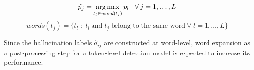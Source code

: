 $$
\Tilde{p_j} = \operatorname*{\arg\max}_{t_l \in word(t_j)} p_l\;\;\; \forall\; j = 1, \ldots, L
$$
$$
words(t_j) = \{t_l \;:\; t_l \;\text{and}\; t_j \;\text{belong to the same word}\; \forall\;l=1,\ldots,L\}
$$

Since the hallucination labels $\hat a_{ij}$ are constructed at word-level, word expansion as a post-processing step for a token-level detection model is expected to increase its performance.
